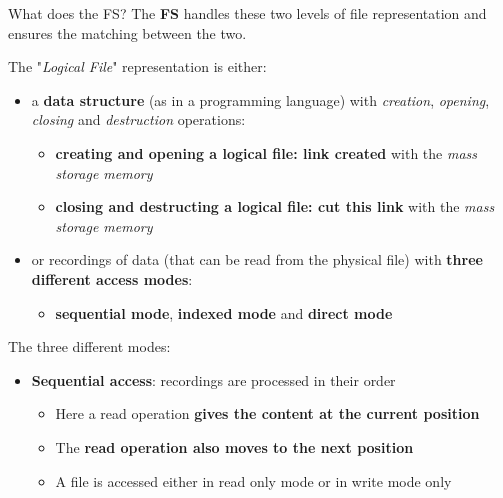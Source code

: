 \documentclass{beamer}[10pt, usepdftitle=false, handout]
\begin{document}
{\begin{frame}
	\vspace*{1em}
	
	\begin{block}{What does the FS?}
	The \textbf{FS} handles these two levels of file representation and ensures the matching between the two. 
	\end{block}	
	
	\end{frame}		
			
	\begin{frame}
	
	The "\textit{Logical File}" representation is either:
	\vspace*{1em}	
	\begin{itemize}
	\item{a \textbf{data structure} (as in a programming language) with \textit{creation}, \textit{opening}, \textit{closing} and \textit{destruction} operations:
		\begin{itemize}
		\item{\textbf{creating and opening a logical file: link created} with the \textit{mass storage memory}}
		\item{\textbf{closing and destructing a logical file: cut this link} with the \textit{mass storage memory}}		
		\end{itemize}			
	}
	\vspace*{1em}
	\item{or recordings of data (that can be read from the physical file) with \textbf{three different access modes}:
		\begin{itemize}
		\item{\textbf{sequential mode}, \textbf{indexed mode} and \textbf{direct mode}}	
		\end{itemize}
	}
	\end{itemize}		
			
	\end{frame}
	
	\begin{frame}
	
	The three different modes:
	\vspace*{1em}
	
	\begin{itemize}
	\item{\textbf{Sequential access}: recordings are processed in their order
	\vspace*{0.5em}
	\begin{itemize}
	\item{Here a read operation \textbf{gives the content at the current position}}
	\item{The \textbf{read operation also moves to the next position}\footnotemark[1]}
	\item{A file is accessed either in read only mode or in write mode only}	
	

\end{itemize}}
\end{itemize}
\end{frame}}
\end{document}

